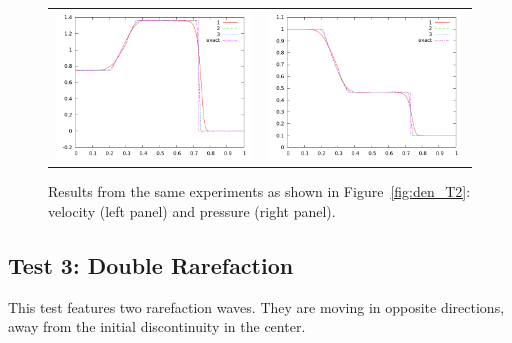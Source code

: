 \documentclass[10pt]{article}
\begin{document}
\begin{figure}
  \begin{center}
	\begin{tabular}{cc}
      \includegraphics[width=.475\textwidth]{vel_T2.png} &
	  \includegraphics[width=.475\textwidth]{prs_T2.png}
	\end{tabular}
  \end{center}
  \caption{Results from the same experiments as shown in Figure~\ref{fig:den_T2}:
  velocity (left panel) and pressure (right panel).}
\end{figure}


\clearpage

\subsection{Test 3: Double Rarefaction}
This test features two rarefaction waves. They are moving in opposite directions, away from the initial discontinuity in the center. 
\end{document}
